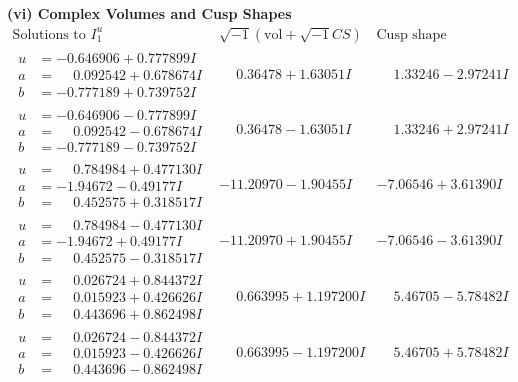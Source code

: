 \documentclass[1p]{elsarticle_modified}
\theoremstyle{definition}
\newcommand{\I}{\sqrt{-1}}
\begin{document}
\newpage\flushleft \textbf{(vi) Complex Volumes and Cusp Shapes}
$$\begin{array}{c|c|c}  
\text{Solutions to }I^u_{1}& \I (\text{vol} + \sqrt{-1}CS) & \text{Cusp shape}\\
 \hline 
\begin{aligned}
u &= -0.646906 + 0.777899 I \\
a &= \phantom{-}0.092542 + 0.678674 I \\
b &= -0.777189 + 0.739752 I\end{aligned}
 & \phantom{-}0.36478 + 1.63051 I & \phantom{-}1.33246 - 2.97241 I \\ \hline\begin{aligned}
u &= -0.646906 - 0.777899 I \\
a &= \phantom{-}0.092542 - 0.678674 I \\
b &= -0.777189 - 0.739752 I\end{aligned}
 & \phantom{-}0.36478 - 1.63051 I & \phantom{-}1.33246 + 2.97241 I \\ \hline\begin{aligned}
u &= \phantom{-}0.784984 + 0.477130 I \\
a &= -1.94672 - 0.49177 I \\
b &= \phantom{-}0.452575 + 0.318517 I\end{aligned}
 & -11.20970 - 1.90455 I & -7.06546 + 3.61390 I \\ \hline\begin{aligned}
u &= \phantom{-}0.784984 - 0.477130 I \\
a &= -1.94672 + 0.49177 I \\
b &= \phantom{-}0.452575 - 0.318517 I\end{aligned}
 & -11.20970 + 1.90455 I & -7.06546 - 3.61390 I \\ \hline\begin{aligned}
u &= \phantom{-}0.026724 + 0.844372 I \\
a &= \phantom{-}0.015923 + 0.426626 I \\
b &= \phantom{-}0.443696 + 0.862498 I\end{aligned}
 & \phantom{-}0.663995 + 1.197200 I & \phantom{-}5.46705 - 5.78482 I \\ \hline\begin{aligned}
u &= \phantom{-}0.026724 - 0.844372 I \\
a &= \phantom{-}0.015923 - 0.426626 I \\
b &= \phantom{-}0.443696 - 0.862498 I\end{aligned}
 & \phantom{-}0.663995 - 1.197200 I & \phantom{-}5.46705 + 5.78482 I \\ \hline\begin{aligned}

\end{aligned}
\end{array}$$
\end{document}
